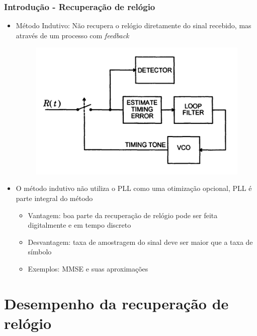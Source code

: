 \begin{frame}
	\frametitle{Introdução - Recuperação de relógio}
	
	\begin{itemize}
		\item Método Indutivo: Não recupera o relógio diretamente do sinal recebido, mas através de um processo com \textit{feedback}
		\begin{figure}
			\centering
			\includegraphics[width=.4\textwidth]{figs/metodo_indutivo}
		\end{figure}
		\item O método indutivo não utiliza o PLL como uma otimização opcional, PLL é parte integral do método
		\begin{itemize}
			\item Vantagem: boa parte da recuperação de relógio pode ser feita digitalmente e em tempo discreto
			\item Desvantagem: taxa de amostragem do sinal deve ser maior que a taxa de símbolo
			\item Exemplos: MMSE e suas aproximações
		\end{itemize}
	\end{itemize}			
\end{frame}

\section{Desempenho da recuperação de relógio}

